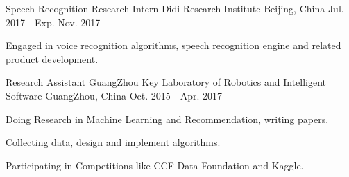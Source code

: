 \begin{cventries}
  \cventry
    {Speech Recognition Research Intern}
    {Didi Research Institute}
    {Beijing, China}
    {Jul. 2017 - Exp. Nov. 2017}
    {
      \begin{cvitems}
        \item {Engaged in voice recognition algorithms, speech recognition engine and related product development.}
      \end{cvitems}
    }
  \cventry
    {Research Assistant}
    {GuangZhou Key Laboratory of Robotics and Intelligent Software}
    {GuangZhou, China}
    {Oct. 2015 - Apr. 2017}
    {
      \begin{cvitems}
        \item {Doing Research in Machine Learning and Recommendation, writing papers.}
        \item {Collecting data, design and implement algorithms.}
        \item {Participating in Competitions like CCF Data Foundation and Kaggle.}
      \end{cvitems}
    }
\end{cventries}
